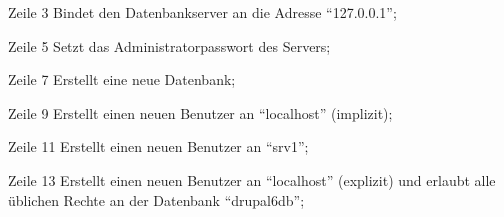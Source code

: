 \begin{asparadesc}
\item[Zeile 3] Bindet den Datenbankserver an die Adresse ``127.0.0.1'';
\item[Zeile 5] Setzt das Administratorpasswort des Servers;
\item[Zeile 7] Erstellt eine neue Datenbank;
\item[Zeile 9] Erstellt einen neuen Benutzer an ``localhost'' (implizit);
\item[Zeile 11] Erstellt einen neuen Benutzer an ``srv1'';
\item[Zeile 13] Erstellt einen neuen Benutzer an ``localhost'' (explizit) und
erlaubt alle üblichen Rechte an der Datenbank ``drupal6db'';
\end{asparadesc}

